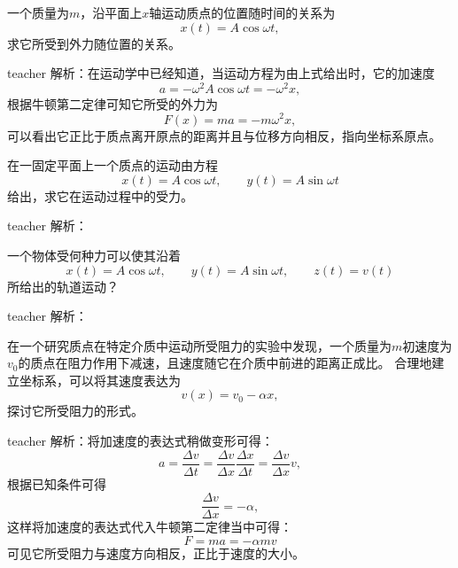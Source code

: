 \begin{example}

一个质量为$m$，沿平面上$x$轴运动质点的位置随时间的关系为
\[
x(t) = A\cos\omega t,
\]
求它所受到外力随位置的关系。
\begin{taggedblock}{teacher}
\newline
解析：在运动学中已经知道，当运动方程为由上式给出时，它的加速度
\[
a = -\omega^2 A \cos\omega t = -\omega^2 x,
\]
根据牛顿第二定律可知它所受的外力为
\[
F(x) = ma = -m\omega^2 x,
\]
可以看出它正比于质点离开原点的距离并且与位移方向相反，指向坐标系原点。
\end{taggedblock}
\end{example}


\begin{example}
	在一固定平面上一个质点的运动由方程
	\[
		x(t)=A\cos\omega t, \qquad y(t)=A\sin\omega t
	\]
	给出，求它在运动过程中的受力。
	\begin{taggedblock}{teacher}
	\newline	
		解析：
	\end{taggedblock}
\end{example}

\begin{example}
	一个物体受何种力可以使其沿着
	\[
	x(t)=A\cos\omega t, \qquad y(t)=A\sin\omega t,\qquad z(t)=v(t)
	\]
	所给出的轨道运动？
	\begin{taggedblock}{teacher}
\newline	
		解析：
	\end{taggedblock}
\end{example}

\begin{example}

在一个研究质点在特定介质中运动所受阻力的实验中发现，一个质量为$m$初速度为$v_0$的质点在阻力作用下减速，且速度随它在介质中前进的距离正成比。
合理地建立坐标系，可以将其速度表达为
\[
v(x) = v_0 - \alpha x,
\]
探讨它所受阻力的形式。
\begin{taggedblock}{teacher}
\newline
解析：将加速度的表达式稍做变形可得：
\[
a = \frac{\Delta v}{\Delta t} = \frac{\Delta v}{\Delta x}\frac{\Delta x}{\Delta t} = \frac{\Delta v}{\Delta x}v,
\]
根据已知条件可得
\[
\frac{\Delta v}{\Delta x} = -\alpha,
\]
这样将加速度的表达式代入牛顿第二定律当中可得：
\[
F = ma = -\alpha m v
\]
可见它所受阻力与速度方向相反，正比于速度的大小。
\end{taggedblock}
\end{example}

